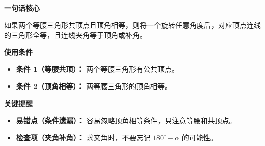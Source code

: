 \begin{summarybox}
	\textbf{\textcolor{CSummary}{一句话核心}}

	如果两个等腰三角形共顶点且顶角相等，则将一个旋转任意角度后，对应顶点连线的三角形全等，且连线夹角等于顶角或补角。

	\medskip
	\textbf{\textcolor{CSummary}{使用条件}}
	\begin{itemize}[leftmargin=*, itemsep=0.5em, topsep=0.4em]
		\item \textbf{条件 1（等腰共顶）：} 两个等腰三角形有公共顶点。
		\item \textbf{条件 2（顶角相等）：} 两等腰三角形的顶角相等。
	\end{itemize}

	\medskip
	\textbf{\textcolor{CSummary}{关键提醒}}
	\begin{itemize}[leftmargin=*, itemsep=0.5em, topsep=0.4em]
		\item \textbf{易错点（条件遗漏）：} 容易忽略顶角相等条件，只注意等腰和共顶点。
		\item \textbf{检查项（夹角补角）：} 求夹角时，不要忘记 $180^\circ-\alpha$ 的可能性。
	\end{itemize}
\end{summarybox}
